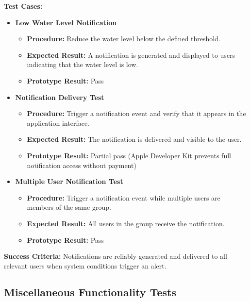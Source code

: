 \noindent{}\textbf{Test Cases:}
\begin{itemize}
\setlength{\itemsep}{0pt}
\setlength{\parskip}{0pt}
\setlength{\parsep}{0pt}
\setlength{\topsep}{0pt}

\item \textbf{Low Water Level Notification}
\begin{itemize}
\item \textbf{Procedure:} Reduce the water level below the defined threshold.
\item \textbf{Expected Result:} A notification is generated and displayed to users indicating that the water level is low.
\item \textbf{Prototype Result:} Pass
\end{itemize}

\item \textbf{Notification Delivery Test}
\begin{itemize}
\item \textbf{Procedure:} Trigger a notification event and verify that it appears in the application interface.
\item \textbf{Expected Result:} The notification is delivered and visible to the user.
\item \textbf{Prototype Result:} Partial pass (Apple Developer Kit prevents full notification access without payment)
\end{itemize}

\item \textbf{Multiple User Notification Test}
\begin{itemize}
\item \textbf{Procedure:} Trigger a notification event while multiple users are members of the same group.
\item \textbf{Expected Result:} All users in the group receive the notification.
\item \textbf{Prototype Result:} Pass
\end{itemize}

\end{itemize}

\noindent{}\textbf{Success Criteria:}
Notifications are reliably generated and delivered to all relevant users when system conditions trigger an alert.



\subsection*{Miscellaneous Functionality Tests}

